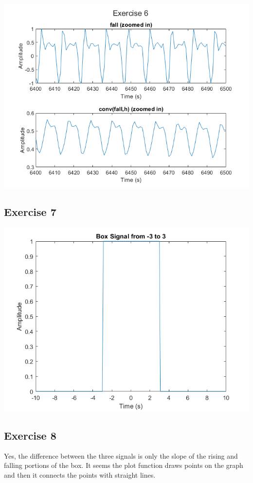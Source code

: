 \documentclass[11pt]{article}
\begin{document}
\includegraphics[width=\textwidth]{exercise6.png}

\subsection{Exercise 7}



\includegraphics[width=\textwidth]{exercise7.png}

\subsection{Exercise 8}

Yes, the difference between the three signals is only the slope of the rising and falling portions of the box.
It seems the plot function draws points on the graph and then it connects the points with straight lines.\\
\end{document}
